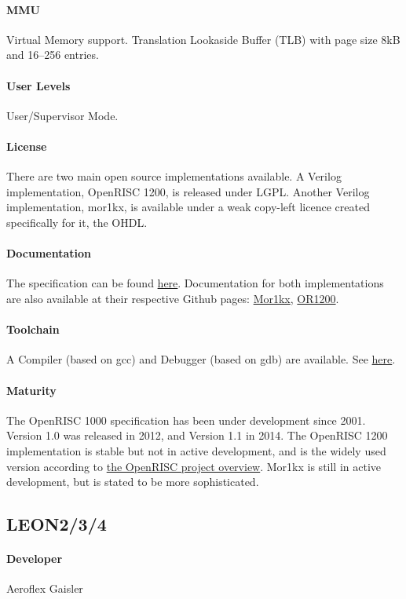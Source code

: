 \paragraph{MMU} Virtual Memory support. Translation Lookaside Buffer (TLB) with page size 8kB and 16--256 entries.
\paragraph{User Levels} User/Supervisor Mode.
\paragraph{License} There are two main open source implementations available. A Verilog implementation, OpenRISC 1200, is released under LGPL. Another Verilog implementation, mor1kx, is available under a weak copy-left licence created specifically for it, the OHDL.
\paragraph{Documentation} The specification can be found \href{https://github.com/openrisc/doc/blob/master/openrisc-arch-1.1-rev0.pdf?raw=true}{here}. Documentation for both implementations are also available at their respective Github pages: \href{https://github.com/openrisc/mor1kx}{Mor1kx}, \href{https://github.com/openrisc/or1200}{OR1200}.
\paragraph{Toolchain} A Compiler (based on gcc) and Debugger (based on gdb) are available. See \href{http://opencores.org/or1k/OpenRISC_GNU_tool_chain#Tools}{here}.
\paragraph{Maturity} The OpenRISC 1000 specification has been under development since 2001. Version 1.0 was released in 2012, and Version 1.1 in 2014. The OpenRISC 1200 implementation is stable but not in active development, and is the widely used version according to \href{http://openrisc.github.io/}{the OpenRISC project overview}. Mor1kx is still in active development, but is stated to be more sophisticated.

\subsection{LEON2/3/4}
\paragraph{Developer} Aeroflex Gaisler
